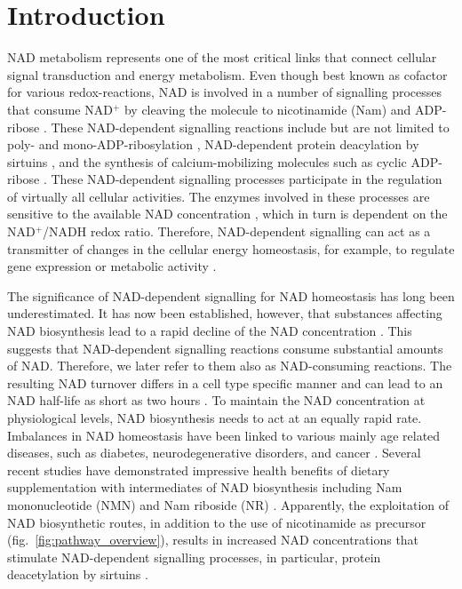 
\section{Introduction}

NAD metabolism represents one of the most critical links that connect cellular signal transduction and energy metabolism. Even though best known as cofactor for various redox-reactions, NAD is involved in a number of signalling processes that consume NAD$^{+}$ by cleaving the molecule to nicotinamide (Nam) and ADP-ribose \cite{Verdin2015}. These NAD-dependent signalling reactions include but are not limited to poly- and mono-ADP-ribosylation \cite{Butepage2015,DeVos2012}, NAD-dependent protein deacylation by sirtuins \cite{Osborne2016}, and the synthesis of calcium-mobilizing molecules such as cyclic ADP-ribose \cite{Lee2012}. These NAD-dependent signalling processes participate in the regulation of virtually all cellular activities. The enzymes involved in these processes are sensitive to the available NAD concentration \cite{Ruggieri2015}, which in turn is dependent on the NAD$^{+}$/NADH redox ratio. Therefore, NAD-dependent signalling can act as a transmitter of changes in the cellular energy homeostasis, for example, to regulate gene expression or metabolic activity \cite{Koch-Nolte2009}.

The significance of NAD-dependent signalling for NAD homeostasis has long been underestimated. It has now been established, however, that substances affecting NAD biosynthesis lead to a rapid decline of the NAD concentration \cite{Buonvicino2018}. This  suggests that NAD-dependent signalling reactions consume substantial amounts of NAD. Therefore, we later refer to them also as NAD-consuming reactions. The resulting NAD turnover differs in a cell type specific manner and can lead to an NAD half-life as short as two hours \cite{Liu2018}. To maintain the NAD concentration at physiological levels, NAD biosynthesis needs to act at an equally rapid rate. Imbalances in NAD homeostasis have been linked to various mainly age related diseases, such as diabetes, neurodegenerative disorders, and cancer \cite{Chiarugi2012,Verdin2015}. Several recent studies have demonstrated impressive health benefits of dietary supplementation with intermediates of NAD biosynthesis including Nam mononucleotide (NMN) and Nam riboside (NR) \cite{Yoshino2018}. Apparently, the exploitation of NAD biosynthetic routes, in addition to the use of nicotinamide as precursor (fig.~\ref{fig:pathway_overview}), results in increased NAD concentrations that stimulate NAD-dependent signalling processes, in particular, protein deacetylation by sirtuins \cite{North2004}.

